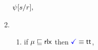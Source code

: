 \begin{minipage}{1.0\linewidth}
\begin{multicols}{2}
\begin{enumerate}[topsep=0pt,label=(\textsc{r}\arabic*),ref=\textsc{r}\arabic*]
\begin{math}
\begin{aligned}[t]
          \psi[s/r],
        \end{aligned}
      \end{math}
      \columnbreak
    \item[] 
      \begin{enumerate}[leftmargin=0pt]
      \item \label{read-term-nonempty-ca-addr}
        if $\mu\sqsubseteq{\mathsf{rlx}}$ then $\aTerm \riff \TRUE$,

\end{enumerate}
\end{enumerate}
\end{multicols}
\end{minipage}
